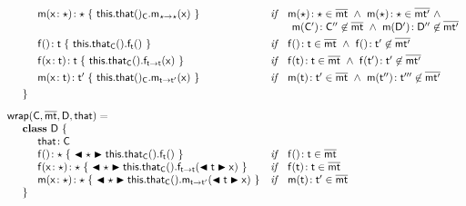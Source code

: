 \documentclass[acmlarge, anonymous, authordraft]{acmart}
\begin{document}
\begin{figure}[!ht]
\[\begin{array}{@{}ll@{}l@{}r@{~}c@{~}r}
\\[-3mm]
\SPP \Mdef\m\x\any\any{~{\KCall{\this.\that()_{\C}}\m{\x}\any\any}~}
&    \textit{if}\,\,\,\,\,\, \Mtype\m\any\any\in\bmt ~\wedge~ \Mtype\m\any\any\in\bmtp ~\wedge~ \\
&     \multicolumn{5}{l}{\qquad \Mtype\m\Cp\Cpp\not\in\bmt ~\wedge~ \Mtype\m\Dp\Dpp\not\in\bmtp} \\
\\[-3mm]
\SPP \Mdefz\f\t { ~\Get{\Get\this\that\C}\f\t~}
&    \textit{if}\,\,\,\,\,\, \Mtype\f{}\t \in \bmt ~\wedge~ \Mtype\f{}\tp \not\in \bmtp \\
\\[-3mm]
\SPP \Mdef\f\x\t\t { ~\Set{\Get\this\that\C}\f\t\x~}
&    \textit{if}\,\,\,\,\,\, \Mtype\f\t\t \in \bmt~\wedge~ \Mtype\f\tp\tp \not\in \bmtp \\
\\[-3mm]
\SPP \Mdef\m\x{\t}{\tp}{~\KCall{\this.\that()_{\C}}\m{\x}\t\tp~}
&    \textit{if}\,\,\,\,\,\, \Mtype\m\t\tp\in\bmt ~\wedge~ \Mtype\m\tpp\tppp\not\in \bmtp \\
\\[-3mm]
\SP \}
\\[3mm]
\wrapAny\C\bmt\D\that = \\
\SP \class~\D~\{\\
\SPP \Fdef \that \C\\ 
\SPP   \Mdefz\f\any{~\BehCast\any{\Get{{\Get\this\that\C}}\f\t}~}
&  \textit{if}\,\,\,\,\,\, \Mtype\f{}\t \in \bmt\\
\SPP   \Mdef\f\x\any\any{~\BehCast\any{\Set{\Get\this\that\C}\f\t{\bscast\t\x}}~}
&  \textit{if}\,\,\,\,\,\, \Mtype\f\t\t \in \bmt\\
\SPP   \Mdef\m\x\any\any {~\bscast\any{\KCall{\Get\this\that\C}\m{\bscast{\t}\x}\t\tp }~}
& \textit{if}\,\,\,\,\,\,  \Mtype\m\t\tp\in\b\mt \\
\SP \}\\

\end{array}\]
%


\end{figure}
\end{document}
